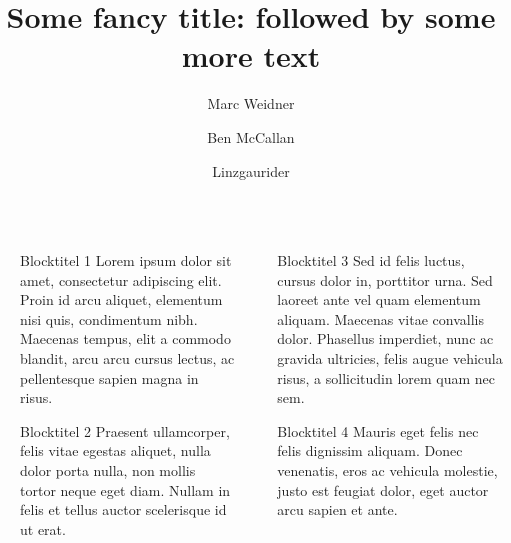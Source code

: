 \documentclass[final]{beamer}
\title{Some fancy title: followed by some more text}
\author{Marc Weidner \inst{1} \and Ben McCallan \inst{2} \and Linzgaurider \inst{2}}
\institute[shortinst]{\inst{1} Some Institute \samelineand \inst{2} Another Institute}
\newlength{\sepwidth}
\newlength{\colwidth}
\newcommand{\separatorcolumn}{\begin{column}{\sepwidth}\end{column}}
\begin{document}
	
	\begin{frame}[t]
		\begin{columns}[t]
			\separatorcolumn
			
			\begin{column}{\colwidth}
				\begin{block}{Blocktitel 1}
					Lorem ipsum dolor sit amet, consectetur adipiscing elit. Proin id arcu aliquet, elementum nisi quis, condimentum nibh. Maecenas tempus, elit a commodo blandit, arcu arcu cursus lectus, ac pellentesque sapien magna in risus.
				\end{block}
				
				\begin{block}{Blocktitel 2}
					Praesent ullamcorper, felis vitae egestas aliquet, nulla dolor porta nulla, non mollis tortor neque eget diam. Nullam in felis et tellus auctor scelerisque id ut erat.
				\end{block}
			\end{column}
			
			\separatorcolumn
			
			\begin{column}{\colwidth}
				\begin{block}{Blocktitel 3}
					Sed id felis luctus, cursus dolor in, porttitor urna. Sed laoreet ante vel quam elementum aliquam. Maecenas vitae convallis dolor. Phasellus imperdiet, nunc ac gravida ultricies, felis augue vehicula risus, a sollicitudin lorem quam nec sem.
				\end{block}
				
				\begin{block}{Blocktitel 4}
					Mauris eget felis nec felis dignissim aliquam. Donec venenatis, eros ac vehicula molestie, justo est feugiat dolor, eget auctor arcu sapien et ante.
				\end{block}
			\end{column}
			
		\end{columns}
	\end{frame}
	
\end{document}
